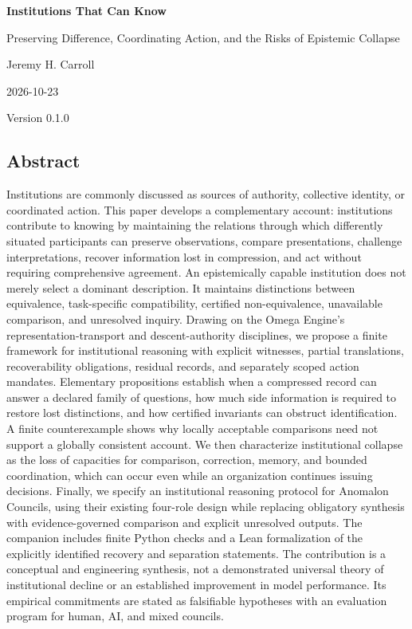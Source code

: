 \documentclass[
  10pt,
]{article}
\author{}
\date{}
\begin{document}
\begin{center}
{\LARGE\bfseries Institutions That Can Know\par}
Preserving Difference, Coordinating Action, and the Risks of Epistemic
Collapse\par
Jeremy H. Carroll\par
2026-10-23\par
Version 0.1.0\par
\end{center}

\subsection{Abstract}\label{abstract}

Institutions are commonly discussed as sources of authority, collective identity, or coordinated action. This paper develops a complementary account: institutions contribute to knowing by maintaining the relations through which differently situated participants can preserve observations, compare presentations, challenge interpretations, recover information lost in compression, and act without requiring comprehensive agreement. An epistemically capable institution does not merely select a dominant description. It maintains distinctions between equivalence, task-specific compatibility, certified non-equivalence, unavailable comparison, and unresolved inquiry. Drawing on the Omega Engine's representation-transport and descent-authority disciplines, we propose a finite framework for institutional reasoning with explicit witnesses, partial translations, recoverability obligations, residual records, and separately scoped action mandates. Elementary propositions establish when a compressed record can answer a declared family of questions, how much side information is required to restore lost distinctions, and how certified invariants can obstruct identification. A finite counterexample shows why locally acceptable comparisons need not support a globally consistent account. We then characterize institutional collapse as the loss of capacities for comparison, correction, memory, and bounded coordination, which can occur even while an organization continues issuing decisions. Finally, we specify an institutional reasoning protocol for Anomalon Councils, using their existing four-role design while replacing obligatory synthesis with evidence-governed comparison and explicit unresolved outputs. The companion includes finite Python checks and a Lean formalization of the explicitly identified recovery and separation statements. The contribution is a conceptual and engineering synthesis, not a demonstrated universal theory of institutional decline or an established improvement in model performance. Its empirical commitments are stated as falsifiable hypotheses with an evaluation program for human, AI, and mixed councils.
\end{document}
